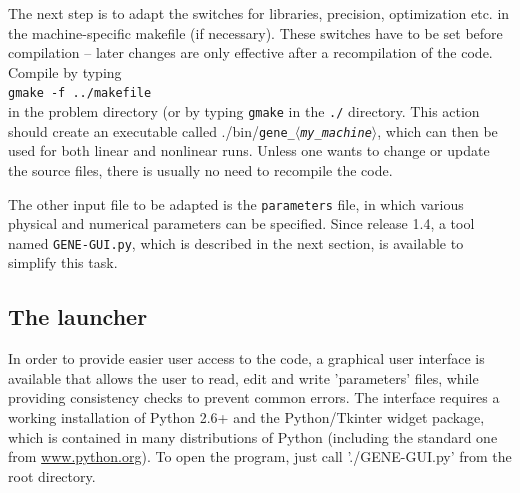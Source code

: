 \documentclass[12pt]{article}
\newcommand{\mach}{$\langle$\textsl{my\_machine}$\rangle$}
\begin{document}
The next step is to adapt the switches for libraries, precision, optimization etc. in the machine-specific
makefile (if necessary). These switches have to be set before compilation -- later changes are only effective
after a recompilation of the code. Compile \gene by typing \\
\qquad\verb|gmake -f ../makefile| \\
in the problem directory (or by typing \verb|gmake| in the \texttt{./} directory. This action should create
an executable called ./bin/\texttt{gene\_\mach}, which can then
be used for both linear and nonlinear runs. Unless one wants to change or update the source files, there is
usually no need to recompile the code.

The other input file to be adapted is the \texttt{parameters} file, in which various physical and numerical
parameters can be specified. Since release 1.4, a tool named \texttt{GENE-GUI.py}, which is described
in the next section, is available to simplify this task.


\subsection{The \gene launcher}
In order to provide easier user access to the \gene code, a graphical user interface is available that allows
the user to read, edit and write 'parameters' files, while providing consistency checks to prevent common
errors.
The interface requires a working installation of Python 2.6+ and the Python/Tkinter widget package, which
is contained in many distributions of Python (including the standard one from \url{www.python.org}). To open the program,
just call './GENE-GUI.py' from the \gene root directory.
\end{document}
